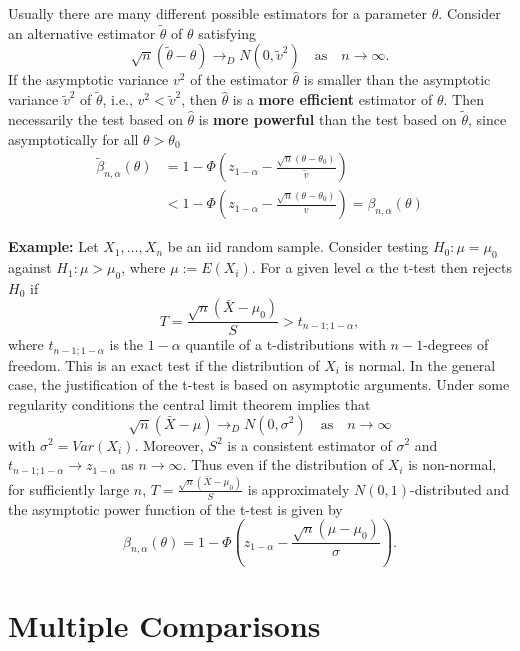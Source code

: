 \documentclass[]{book}
\theoremstyle{definition}
\theoremstyle{definition}
\theoremstyle{definition}
\theoremstyle{remark}
\begin{document}
Usually there are many different possible estimators for a parameter \(\theta\). Consider an alternative estimator \(\tilde\theta\) of \(\theta\) satisfying
\[
\sqrt{n}(\tilde\theta - \theta)\rightarrow_D N(0,\tilde v^2) \quad\text{as}\quad n\rightarrow\infty.
\]
If the asymptotic variance \(v^2\) of the estimator \(\hat\theta\) is smaller than the asymptotic variance \(\tilde v^2\) of \(\tilde\theta\), i.e., \(v^2<\tilde v^2\), then \(\hat\theta\) is a \textbf{more efficient} estimator of \(\theta\). Then necessarily the test based on \(\hat\theta\) is \textbf{more powerful} than the test based on \(\tilde\theta\), since asymptotically for all \(\theta>\theta_0\)
\begin{align*}
\tilde\beta_{n,\alpha}(\theta) &= 1-\Phi\left(z_{1-\alpha}-\frac{\sqrt{n} (\theta -\theta_0)}{\tilde v}\right)\\
& < 1-\Phi\left(z_{1-\alpha}-\frac{\sqrt{n} (\theta -\theta_0)}{v}\right)=\beta_{n,\alpha}(\theta)
\end{align*}

\textbf{Example:} Let \(X_1,\dots,X_n\) be an iid random sample. Consider testing \(H_0:\mu=\mu_0\) against \(H_1:\mu>\mu_0\), where \(\mu:=E(X_i)\). For a given level \(\alpha\) the t-test then rejects \(H_0\) if
\[
T=\frac{\sqrt{n}(\bar X-\mu_0)}{S}>t_{n-1;1-\alpha},
\]
where \(t_{n-1;1-\alpha}\) is the \(1-\alpha\) quantile of a t-distributions with \(n-1\)-degrees of freedom. This is an exact test if the distribution of \(X_i\) is normal. In the general case, the justification of the t-test is based on asymptotic arguments. Under some regularity conditions the central limit theorem implies that
\[
\sqrt{n}(\bar X - \mu)\rightarrow_D N(0,\sigma^2)\quad\text{as}\quad n\rightarrow\infty
\]
with \(\sigma^2=Var(X_i)\). Moreover, \(S^2\) is a consistent estimator of \(\sigma^2\) and \(t_{n-1;1-\alpha}\rightarrow z_{1-\alpha}\) as \(n\rightarrow \infty\). Thus even if the distribution of \(X_i\) is non-normal, for sufficiently large \(n\), \(T=\frac{\sqrt{n}(\bar X-\mu_0)}{S}\) is approximately \(N(0,1)\)-distributed and the asymptotic power function of the t-test is given by
\[
\beta_{n,\alpha}(\theta) = 1-\Phi\left(z_{1-\alpha}-\frac{\sqrt{n} (\mu -\mu_0)}{\sigma}\right).
\]

\hypertarget{multiple-comparisons}{%
\section{Multiple Comparisons}\label{multiple-comparisons}}
\end{document}
